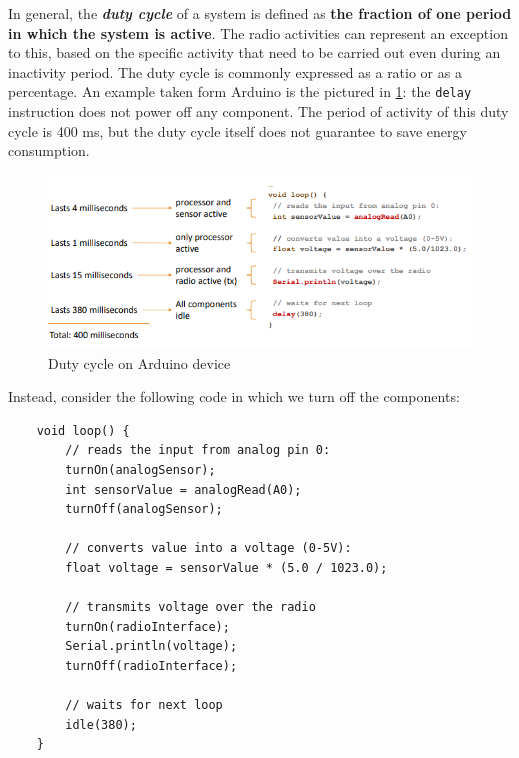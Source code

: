 \documentclass[10pt,a4paper]{report}
\theoremstyle{definition}
\begin{document}
In general, the \textit{\textbf{duty cycle}} of a system is defined as \textbf{the fraction of one period in which the system is active}. The radio activities can represent an exception to this, based on the specific activity that need to be carried out even during an inactivity period.
The duty cycle is commonly expressed as a ratio or as a percentage. An example taken form Arduino is the pictured in \ref{arduino-dc-1}: the \texttt{delay} instruction does not power off any component. The period of activity of this duty cycle is 400 ms, but the duty cycle itself does not guarantee to save energy consumption.

\begin{figure}[!h]
	\centering\includegraphics[scale=0.60]{images/Pasted image 20230324165412.png}
	\caption{Duty cycle on Arduino device}
	\label{arduino-dc-1}
\end{figure}


Instead, consider the following code in which we turn off the components:
\begin{lstlisting}
	void loop() { 
		// reads the input from analog pin 0:
		turnOn(analogSensor); 
		int sensorValue = analogRead(A0);
		turnOff(analogSensor); 
		
		// converts value into a voltage (0-5V):
		float voltage = sensorValue * (5.0 / 1023.0); 
		
		// transmits voltage over the radio
		turnOn(radioInterface); 
		Serial.println(voltage);
		turnOff(radioInterface);
		
		// waits for next loop 
		idle(380); 
	}
\end{lstlisting}
\end{document}

